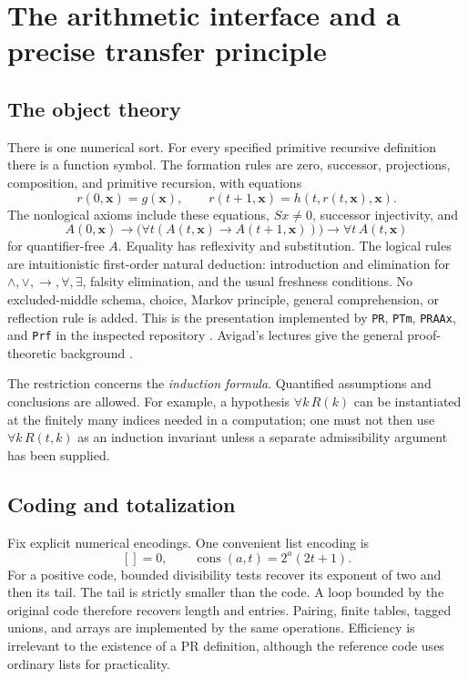\section{The arithmetic interface and a precise transfer principle}
\label{sec:arithmetic}

\subsection{The object theory}

There is one numerical sort. For every specified primitive recursive
definition there is a function symbol. The formation rules are zero,
successor, projections, composition, and primitive recursion, with equations
\[
 r(0,\boldsymbol x)=g(\boldsymbol x),\qquad
 r(t+1,\boldsymbol x)=h(t,r(t,\boldsymbol x),\boldsymbol x).
\]
The nonlogical axioms include these equations, $Sx\ne0$, successor
injectivity, and
\[
 A(0,\boldsymbol x)\to
 \bigl(\forall t(A(t,\boldsymbol x)\to A(t+1,\boldsymbol x))\bigr)
 \to\forall t\,A(t,\boldsymbol x)
\]
for quantifier-free $A$. Equality has reflexivity and substitution. The
logical rules are intuitionistic first-order natural deduction: introduction
and elimination for $\wedge,\vee,\to,\forall,\exists$, falsity elimination,
and the usual freshness conditions. No excluded-middle schema, choice,
Markov principle, general comprehension, or reflection rule is added.
This is the presentation implemented by \texttt{PR}, \texttt{PTm},
\texttt{PRAAx}, and \texttt{Prf} in the inspected repository
\cite{repo-pr,repo-deduction}. Avigad's lectures give the general
proof-theoretic background \cite{avigad2015}.

The restriction concerns the \emph{induction formula}. Quantified assumptions
and conclusions are allowed. For example, a hypothesis $\forall k\,R(k)$
can be instantiated at the finitely many indices needed in a computation;
one must not then use $\forall k\,R(t,k)$ as an induction invariant unless a
separate admissibility argument has been supplied.

\subsection{Coding and totalization}

Fix explicit numerical encodings. One convenient list encoding is
\[
 []=0,\qquad \operatorname{cons}(a,t)=2^a(2t+1).
\]
For a positive code, bounded divisibility tests recover its exponent of two
and then its tail. The tail is strictly smaller than the code. A loop bounded
by the original code therefore recovers length and entries. Pairing, finite
tables, tagged unions, and arrays are implemented by the same operations.
Efficiency is irrelevant to the existence of a PR definition, although the
reference code uses ordinary lists for practicality.

